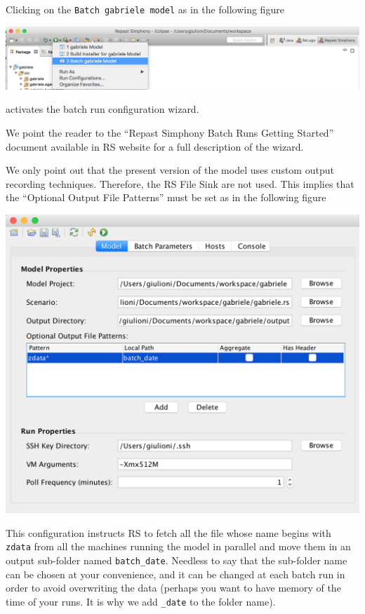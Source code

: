 \documentclass{book}
\begin{document}
Clicking on the \verb+Batch gabriele model+ as in the following figure

\noindent
\includegraphics[scale=0.35]{fig_gabriele_rs_execution3}

activates the batch run configuration wizard.

We point the reader to the ``Repast Simphony Batch Runs Getting Started'' document available in RS website for a full description of the wizard.

We only point out that the present version of the model uses custom output recording techniques. Therefore, the RS File Sink are not used. This implies that the ``Optional Output File Patterns'' must be set as in the following figure

\noindent
\includegraphics[scale=0.35]{fig_gabriele_rs_batch}

This configuration instructs RS to fetch
all the file whose name begins with \verb+zdata+  
from all the machines running the model in parallel 
and move them in an output sub-folder named 
\verb+batch_date+. Needless to say that the sub-folder name can be chosen at your convenience, and it can be changed at each batch run in order to avoid overwriting the data (perhaps you want to have memory of the time of your runs. It is why we add \verb+_date+ to the folder name).
\end{document}
